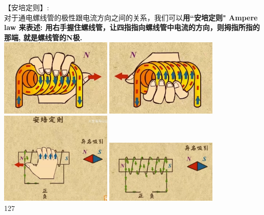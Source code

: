 \documentclass[UTF8]{ctexart}
\begin{document}
		
【安培定则】:\\
对于通电螺线管的极性跟电流方向之间的关系，我们可以\textbf{用``安培定则" Ampere law 来表述: 用右手握住螺线管，让四指指向螺线管中电流的方向，则拇指所指的那端, 就是螺线管的N极.} \\			
		\includegraphics[width=0.4\textwidth]{img/0084.png} 
		\includegraphics[width=0.4\textwidth]{img/0085.png} \\
		\includegraphics[width=0.4\textwidth]{img/0086.png} 
		\includegraphics[width=0.4\textwidth]{img/0087.png} \\
		
		
		




	
127
	
	
	
	
	
	
	
	
	
	
	
	
	
	
	
	
	
	
	
	
		

	


	
	
	
	
	
	
	
	
	
	
	
	
\end{document}
